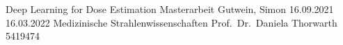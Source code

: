 \documentclass[12pt, oneside]{article}
\begin{document}
\renewcommand{\tableautorefname}{tab.}
\renewcommand{\figureautorefname}{fig.}
\renewcommand{\equationautorefname}{eq.}

\titlespacing{\section}{0pt}{6pt}{12pt}
\titlespacing{\subsection}{0pt}{6pt}{6pt}
\titlespacing{\subsubsection}{0pt}{6pt}{6pt}

    {Deep Learning for Dose Estimation}             %
    {Masterarbeit}                                  %
    {Gutwein, Simon}                                %
    {16.09.2021}                                    %
    {16.03.2022}                                    %
    {Medizinische Strahlenwissenschaften}           %
    {Prof.~Dr.~Daniela Thorwarth}                   %
    {5419474}                                       %


\newpage
{}

\Standard{}


\tableofcontents


\newpage

\listoffigures
{}%


\end{document}
